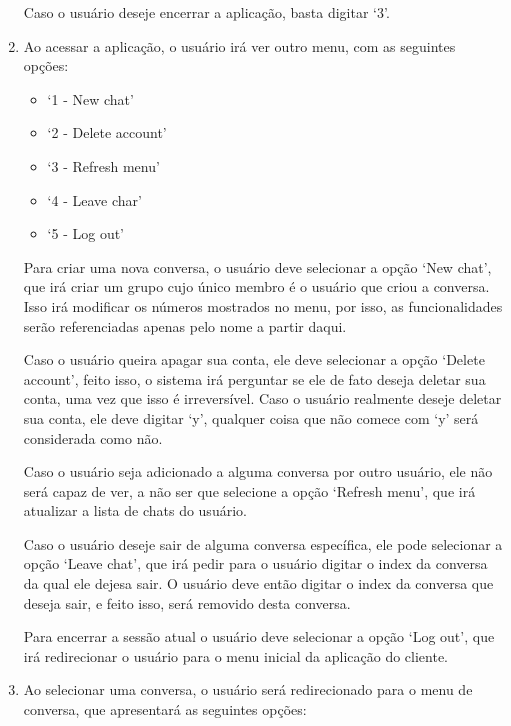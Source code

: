 \documentclass{article}
\begin{document}
\begin{enumerate}
Caso o usuário deseje encerrar a aplicação, basta digitar `3'.

\item Ao acessar a aplicação, o usuário irá ver outro menu, com as seguintes opções:

\begin{itemize}

\item `1 - New chat'

\item `2 - Delete account'

\item `3 - Refresh menu'

\item `4 - Leave char'

\item `5 - Log out'

\end{itemize}

Para criar uma nova conversa, o usuário deve selecionar a opção `New chat', que irá criar um grupo cujo único membro é o usuário que criou a conversa. Isso irá modificar os números mostrados no menu, por isso, as funcionalidades serão referenciadas apenas pelo nome a partir daqui.

Caso o usuário queira apagar sua conta, ele deve selecionar a opção `Delete account', feito isso, o sistema irá perguntar se ele de fato deseja deletar sua conta, uma vez que isso é irreversível. Caso o usuário realmente deseje deletar sua conta, ele deve digitar `y', qualquer coisa que não comece com `y' será considerada como não.

Caso o usuário seja adicionado a alguma conversa por outro usuário, ele não será capaz de ver, a não ser que selecione a opção `Refresh menu', que irá atualizar a lista de chats do usuário.

Caso o usuário deseje sair de alguma conversa específica, ele pode selecionar a opção `Leave chat', que irá pedir para o usuário digitar o index da conversa da qual ele dejesa sair. O usuário deve então digitar o index da conversa que deseja sair, e feito isso, será removido desta conversa.

Para encerrar a sessão atual o usuário deve selecionar a opção `Log out', que irá redirecionar o usuário para o menu inicial da aplicação do cliente.

\item Ao selecionar uma conversa, o usuário será redirecionado para o menu de conversa, que apresentará as seguintes opções:


\end{enumerate}
\end{document}
